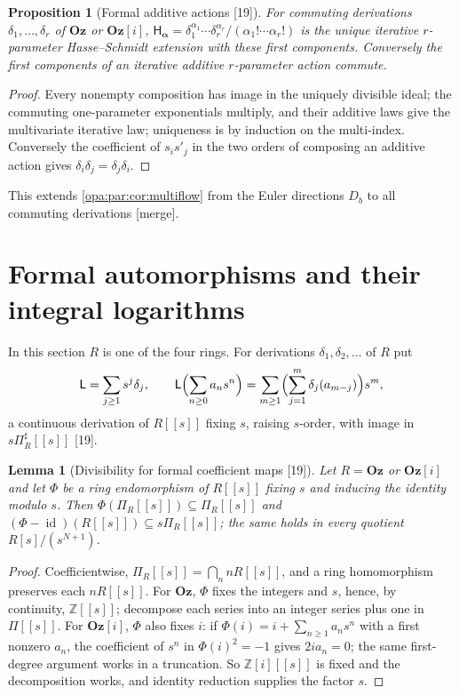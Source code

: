 \documentclass[11pt,oneside]{article}
\numberwithin{equation}{section}
\newtheorem{proposition}[proposition]{Proposition}
\newtheorem{lemma}[lemma]{Lemma}
\theoremstyle{definition}
\theoremstyle{remark}
\newcommand{\Oz}{\mathbf{Oz}}
\newcommand{\Og}{\mathbf{Oz}[i]}
\newcommand{\Z}{\mathbb Z}
\newcommand{\id}{\operatorname{id}}
\newcommand{\src}[1]{\textup{\textsf{\small[#1]}}}
\newcommand{\mergetag}{\textup{\textsf{\small[merge]}}}
\begin{document}
\begin{proposition}[Formal additive actions \src{19}]\label{opa:hs:prop:multiflow}
For commuting derivations $\delta_1,\dots,\delta_r$ of $\Oz$ or $\Og$,
$\mathsf H_{\boldsymbol\alpha}=\delta_1^{\alpha_1}\cdots\delta_r^{\alpha_r}/(\alpha_1!\cdots\alpha_r!)$ is the unique iterative $r$-parameter Hasse--Schmidt
extension with these first components. Conversely the first components of an iterative additive $r$-parameter action commute.
\end{proposition}
\begin{proof}
Every nonempty composition has image in the uniquely divisible ideal; the commuting one-parameter exponentials multiply, and their additive laws
give the multivariate iterative law; uniqueness is by induction on the multi-index. Conversely the coefficient of $s_is'_j$ in the two orders of
composing an additive action gives $\delta_i\delta_j=\delta_j\delta_i$.
\end{proof}

This extends \cref{opa:par:cor:multiflow} from the Euler directions $D_b$ to all commuting derivations \mergetag.

\section{Formal automorphisms and their integral logarithms}\label{opa:hs:sec:lie}

In this section $R$ is one of the four rings. For derivations $\delta_1,\delta_2,\dots$ of $R$ put
\begin{equation}\label{opa:hs:eq:lieseries}
 \mathsf L=\sum_{j\ge1}s^j\delta_j,\qquad \mathsf L\Bigl(\sum_{n\ge0}a_ns^n\Bigr)=\sum_{m\ge1}\Bigl(\sum_{j=1}^m\delta_j(a_{m-j})\Bigr)s^m,
\end{equation}
a continuous derivation of $R[[s]]$ fixing $s$, raising $s$-order, with image in $s\Pi^\sharp_R[[s]]$ \src{19}.

\begin{lemma}[Divisibility for formal coefficient maps \src{19}]\label{opa:hs:lem:formalideal}
Let $R=\Oz$ or $\Og$ and let $\Phi$ be a ring endomorphism of $R[[s]]$ fixing $s$ and inducing the identity modulo $s$. Then
$\Phi(\Pi_R[[s]])\subseteq\Pi_R[[s]]$ and $(\Phi-\id)(R[[s]])\subseteq s\Pi_R[[s]]$; the same holds in every quotient $R[s]/(s^{N+1})$.
\end{lemma}
\begin{proof}
Coefficientwise, $\Pi_R[[s]]=\bigcap_nnR[[s]]$, and a ring homomorphism preserves each $nR[[s]]$. For $\Oz$, $\Phi$ fixes the integers and $s$,
hence, by continuity, $\Z[[s]]$; decompose each series into an integer series plus one in $\Pi[[s]]$. For $\Og$, $\Phi$ also fixes $i$: if
$\Phi(i)=i+\sum_{n\ge1}a_ns^n$ with a first nonzero $a_n$, the coefficient of $s^n$ in $\Phi(i)^2=-1$ gives $2ia_n=0$; the same first-degree argument
works in a truncation. So $\Z[i][[s]]$ is fixed and the decomposition works, and identity reduction supplies the factor $s$.
\end{proof}
\end{document}
